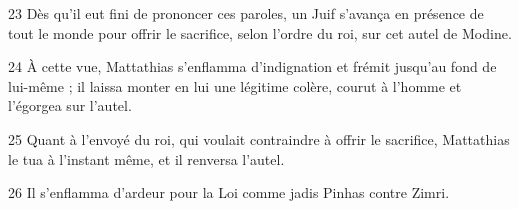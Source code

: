 
23 Dès qu’il eut fini de prononcer ces paroles, un Juif s’avança en présence de tout le monde pour offrir le sacrifice, selon l’ordre du roi, sur cet autel de Modine.

24 À cette vue, Mattathias s’enflamma d’indignation et frémit jusqu’au fond de lui-même ; il laissa monter en lui une légitime colère, courut à l’homme et l’égorgea sur l’autel.

25 Quant à l’envoyé du roi, qui voulait contraindre à offrir le sacrifice, Mattathias le tua à l’instant même, et il renversa l’autel.

26 Il s’enflamma d’ardeur pour la Loi comme jadis Pinhas contre Zimri.
